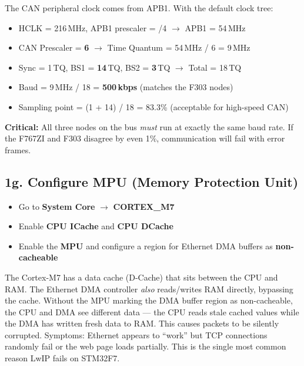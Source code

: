 \documentclass[11pt,a4paper]{article}
\begin{document}
\begin{infobox}
The CAN peripheral clock comes from APB1. With the default clock tree:
\begin{itemize}
  \item HCLK = 216\,MHz, APB1 prescaler = /4 $\rightarrow$ APB1 = 54\,MHz
  \item CAN Prescaler = \textbf{6} $\rightarrow$ Time Quantum = 54\,MHz / 6 = 9\,MHz
  \item Sync = 1\,TQ, BS1 = \textbf{14}\,TQ, BS2 = \textbf{3}\,TQ $\rightarrow$ Total = 18\,TQ
  \item Baud = 9\,MHz / 18 = \textbf{500\,kbps} (matches the F303 nodes)
  \item Sampling point = (1 + 14) / 18 = 83.3\% (acceptable for high-speed CAN)
\end{itemize}
\textbf{Critical:} All three nodes on the bus \emph{must} run at exactly the same baud rate. If the F767ZI and F303 disagree by even 1\%, communication will fail with error frames.
\end{infobox}

\subsection{1g. Configure MPU (Memory Protection Unit)}
\begin{itemize}[leftmargin=2em]
  \item Go to \textbf{System Core} $\rightarrow$ \textbf{CORTEX\_M7}
  \item Enable \textbf{CPU ICache} and \textbf{CPU DCache}
  \item Enable the \textbf{MPU} and configure a region for Ethernet DMA buffers as \textbf{non-cacheable}
\end{itemize}

\begin{warnbox}
The Cortex-M7 has a data cache (D-Cache) that sits between the CPU and RAM. The Ethernet DMA controller \emph{also} reads/writes RAM directly, bypassing the cache. Without the MPU marking the DMA buffer region as non-cacheable, the CPU and DMA see different data --- the CPU reads stale cached values while the DMA has written fresh data to RAM. This causes packets to be silently corrupted. Symptoms: Ethernet appears to ``work'' but TCP connections randomly fail or the web page loads partially. This is the single most common reason LwIP fails on STM32F7.
\end{warnbox}
\end{document}
